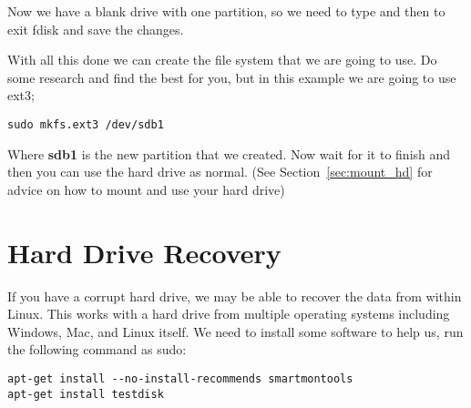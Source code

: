 Now we have a blank drive with one partition, so we need to type  and then \keys{\enter} to exit fdisk and save the changes.

With all this done we can create the file system that we are going to use.  Do some research and find the best for you, but in this example we are going to use ext3;

\begin{lstlisting}
sudo mkfs.ext3 /dev/sdb1
\end{lstlisting}

Where \textbf{sdb1} is the new partition that we created.  Now wait for it to finish and then you can use the hard drive as normal.  (See Section~\ref{sec:mount_hd} for advice on how to mount and use your hard drive)

\section{Hard Drive Recovery}
\label{sec:HDRecovery}

If you have a corrupt hard drive, we may be able to recover the data from within Linux.  This works with a hard drive from multiple operating systems including Windows, Mac, and Linux itself.  We need to install some software to help us, run the following command as sudo:

\begin{lstlisting}
apt-get install --no-install-recommends smartmontools
apt-get install testdisk
\end{lstlisting}